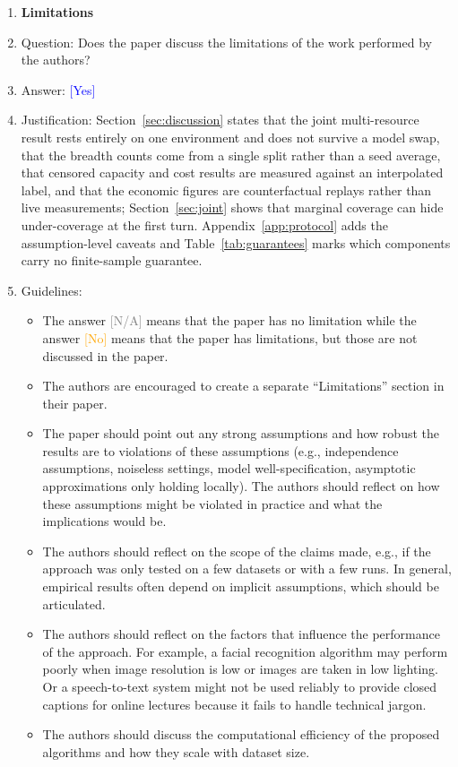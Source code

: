 \documentclass{article}
\providecommand{\answerYes}[1][]{\textcolor{blue}{[Yes] #1}}
\providecommand{\answerNo}[1][]{\textcolor{orange}{[No] #1}}
\providecommand{\answerNA}[1][]{\textcolor{gray}{[N/A] #1}}
\begin{document}
\begin{enumerate}
\item {\bf Limitations}
    \item[] Question: Does the paper discuss the limitations of the work performed by the authors?
    \item[] Answer: \answerYes{}
    \item[] Justification: Section~\ref{sec:discussion} states that the joint multi-resource result rests entirely on one environment and does not survive a model swap, that the breadth counts come from a single split rather than a seed average, that censored capacity and cost results are measured against an interpolated label, and that the economic figures are counterfactual replays rather than live measurements; Section~\ref{sec:joint} shows that marginal coverage can hide under-coverage at the first turn. Appendix~\ref{app:protocol} adds the assumption-level caveats and Table~\ref{tab:guarantees} marks which components carry no finite-sample guarantee.
    \item[] Guidelines:
    \begin{itemize}
        \item The answer \answerNA{} means that the paper has no limitation while the answer \answerNo{} means that the paper has limitations, but those are not discussed in the paper.
        \item The authors are encouraged to create a separate ``Limitations'' section in their paper.
        \item The paper should point out any strong assumptions and how robust the results are to violations of these assumptions (e.g., independence assumptions, noiseless settings, model well-specification, asymptotic approximations only holding locally). The authors should reflect on how these assumptions might be violated in practice and what the implications would be.
        \item The authors should reflect on the scope of the claims made, e.g., if the approach was only tested on a few datasets or with a few runs. In general, empirical results often depend on implicit assumptions, which should be articulated.
        \item The authors should reflect on the factors that influence the performance of the approach. For example, a facial recognition algorithm may perform poorly when image resolution is low or images are taken in low lighting. Or a speech-to-text system might not be used reliably to provide closed captions for online lectures because it fails to handle technical jargon.
        \item The authors should discuss the computational efficiency of the proposed algorithms and how they scale with dataset size.

\end{itemize}
\end{enumerate}
\end{document}
